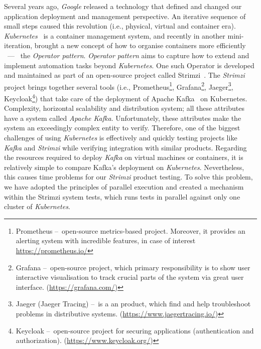 Several years ago, \emph{Google} released a technology that defined and changed our application deployment and management perspective.
An iterative sequence of small steps caused this revolution (i.e., physical, virtual and container era).
\emph{Kubernetes}~\cite{history, kubernetes, kubernetesBook} is a container management system, and recently in another mini-iteration, brought a new concept of how to organise containers more efficiently \ --- \ the \emph{Operator pattern}.
\emph{Operator pattern} aims to capture how to extend and implement automation tasks beyond \emph{Kubernetes}.
One such Operator is developed and maintained as part of an open-source project called Strimzi~\cite{strimziDoc, strimziBlogPosts}.
The \emph{Strimzi} project brings together several tools (i.e.,
Prometheus\footnote{Prometheus \---\ open-source metrics-based project. Moreover, it provides an alerting system with incredible features, in case of interest \url{https://prometheus.io/}},
Grafana\footnote{Grafana \---\ open-source project, which primary responsibility is to show user interactive visualisation to track crucial parts of the system via great user interface. (\url{https://grafana.com/})},
Jaeger\footnote{Jaeger (Jaeger Tracing) \---\ is a an product, which find and help troubleshoot problems in distributive systems. (\url{https://www.jaegertracing.io/})},
Keycloak\footnote{Keycloak \---\ open-source project for securing applications (authentication and authorization). (\url{https://www.keycloak.org/})}) that take care of the deployment of Apache Kafka~\cite{apacheKafkaDefinitiveGuide, apacheKafkaDesignDistributedSystems, kafkaStreamsBook, kafkaDocumentation} on Kubernetes.
Complexity, horizontal scalability and distribution system;
all these attributes have a system called \emph{Apache Kafka}.
Unfortunately, these attributes make the system an exceedingly complex entity to verify.
Therefore, one of the biggest challenges of using \emph{Kubernetes} is effectively and quickly testing projects like \emph{Kafka} and \emph{Strimzi} while verifying integration with similar products.
Regarding the resources required to deploy \emph{Kafka} on virtual machines or containers, it is relatively simple to compare Kafka's deployment on \emph{Kubernetes}.
Nevertheless, this causes time problems for our \emph{Strimzi} product testing.
To solve this problem, we have adopted the principles of parallel execution and created a mechanism within the Strimzi system tests, which runs tests in parallel against only one cluster of \emph{Kubernetes}.

